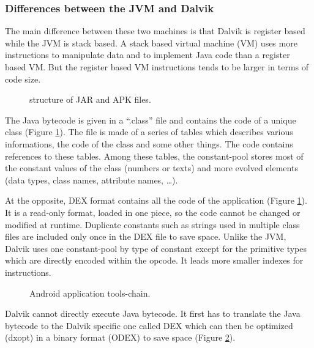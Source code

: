 \documentclass{sig-alternate}
\def \DALVIK{Dalvik\xspace}
\def \ANDROID{Android\xspace}
\def \JVM{JVM\xspace}
\def \DEX{DEX\xspace}
\begin{document}
    \subsubsection{Differences between the JVM and \DALVIK}

      The main difference between these two machines is that \DALVIK is register based while the \JVM is stack based.
      A stack based virtual machine (VM) uses more instructions to manipulate data and to implement Java code than a register based VM.
      But the register based VM instructions tends to be larger in terms of code size\cite{ieee-paul-kundu-energy-perspective}.

      \begin{figure}[!h]
        \centering \resizebox{\linewidth}{!}{}
        \caption{structure of JAR and APK files.}\vspace{-1em}
        \label{SJA}
      \end{figure}

      The Java bytecode is given in a ``.class'' file and contains the code of a unique class (Figure \ref{SJA}).
      The file is made of a series of tables which describes various informations, the code of the class and some other things.
      The code contains references to these tables.
      Among these tables, the constant-pool stores most of the constant values of the class (numbers or texts)
      and more evolved elements (data types, class names, attribute names, \dots).

      At the opposite, \DEX format contains all the code of the application (Figure \ref{SJA}).
      It is a read-only format, loaded in one piece, so the code cannot be changed or modified at runtime.
      Duplicate constants such as strings used in multiple class files
      are included only once in the \DEX file to save space.
      Unlike the \JVM, \DALVIK uses one constant-pool by type of constant
      except for the primitive types which are directly encoded within the opcode.
      It leads more smaller indexes for instructions.\\

      \begin{figure}[!h]
        \centering \resizebox{\linewidth}{!}{}
        \caption{\ANDROID application tools-chain.}
        \label{DTC}
      \end{figure}

      \DALVIK cannot directly execute Java bytecode.
      It first has to translate the Java bytecode to the \DALVIK specific one called \DEX
      which can then be optimized (dxopt) in a binary format (\mbox{ODEX}) to save space (Figure \ref{DTC}).
\end{document}
